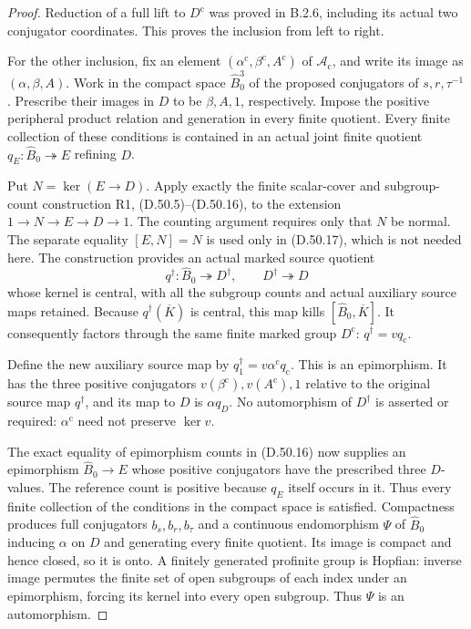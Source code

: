 \begin{proof}
Reduction of a full lift to $D^{\mathrm c}$ was proved
in B.2.6, including its actual two conjugator coordinates.
This proves the inclusion from left to right.

For the other inclusion, fix an element
$(\alpha^{\mathrm c},\beta^{\mathrm c},A^{\mathrm c})$
of $\mathcal A_{\mathrm c}$, and write its image as
$(\alpha,\beta,A)$.  Work in the compact space
$\widehat B_0^3$ of the proposed conjugators of
$s,r,\tau^{-1}$.  Prescribe their images in $D$ to be
$\beta,A,1$, respectively.  Impose the positive
peripheral product relation and generation in every
finite quotient.  Every finite collection of these
conditions is contained in an actual joint finite
quotient $q_E:\widehat B_0\twoheadrightarrow E$ refining
$D$.

Put $N=\ker(E\to D)$.  Apply exactly the finite
scalar-cover and subgroup-count construction R1,
(D.50.5)--(D.50.16), to the extension
$1\to N\to E\to D\to1$.  The counting argument requires
only that $N$ be normal.  The separate equality
$[E,N]=N$ is used only in (D.50.17), which is not needed
here.  The construction provides an actual marked
source quotient
\[
 q^\dagger:\widehat B_0\twoheadrightarrow D^\dagger,
 \qquad D^\dagger\twoheadrightarrow D
\]
whose kernel is central, with all the subgroup counts
and actual auxiliary source maps retained.  Because
$q^\dagger(\overline K)$ is central, this map kills
$[\widehat B_0,\overline K]$.  It consequently factors
through the same finite marked group $D^{\mathrm c}$:
$q^\dagger=vq_{\mathrm c}$.

Define the new auxiliary source map by
$q_1^\dagger=v\alpha^{\mathrm c}q_{\mathrm c}$.  This is
an epimorphism.  It has the three positive conjugators
$v(\beta^{\mathrm c}),v(A^{\mathrm c}),1$ relative to
the original source map $q^\dagger$, and its map to $D$
is $\alpha q_D$.  No automorphism of $D^\dagger$ is
asserted or required: $\alpha^{\mathrm c}$ need not
preserve $\ker v$.

The exact equality of epimorphism counts in (D.50.16)
now supplies an epimorphism $\widehat B_0\to E$ whose
positive conjugators have the prescribed three
$D$-values.  The reference count is positive because
$q_E$ itself occurs in it.  Thus every finite
collection of the conditions in the compact space is
satisfied.  Compactness produces full conjugators
$b_s,b_r,b_\tau$ and a continuous endomorphism $\Psi$
of $\widehat B_0$ inducing $\alpha$ on $D$ and
generating every finite quotient.  Its image is compact
and hence closed, so it is onto.  A finitely generated
profinite group is Hopfian: inverse image permutes the
finite set of open subgroups of each index under an
epimorphism, forcing its kernel into every open
subgroup.  Thus $\Psi$ is an automorphism.


\end{proof}
